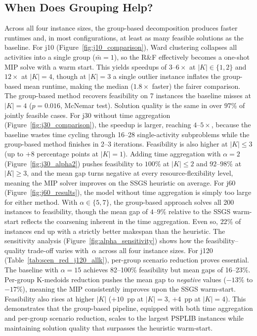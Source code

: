 \subsection{When Does Grouping Help?}
\label{subsec:when_grouping}
Across all four instance sizes, the group-based decomposition
produces faster runtimes and, in most configurations, at least
as many feasible solutions as the baseline.
For j10 (Figure~\ref{fig:j10_comparison}), Ward clustering
collapses all activities into a single group
($\bar{m} = 1$), so the R\&F effectively becomes a
one-shot MIP solve with a warm start. This yields speedups of
$3$--$6\times$ at $|K| \in \{1,2\}$ and $12\times$ at $|K|=4$,
though at $|K|=3$ a single outlier instance inflates the
group-based mean runtime, making the median ($1.8\times$ faster)
the fairer comparison. The group-based method recovers
feasibility on 7 instances the baseline misses at $|K|=4$
($p = 0.016$, McNemar test). Solution quality is the same in
over $97\%$ of jointly feasible cases.
For j30 without time aggregation
(Figure~\ref{fig:j30_comparison}), the speedup is larger,
reaching $4$--$5\times$, because the baseline wastes time cycling
through 16--28 single-activity subproblems while the
group-based method finishes in 2--3 iterations. Feasibility is
also higher at $|K| \leq 3$ (up to $+8$ percentage points at
$|K|=1$). Adding time aggregation with $\alpha = 2$
(Figure~\ref{fig:j30_alpha2}) pushes feasibility to $100\%$ at
$|K| \leq 2$ and $92$--$98\%$ at $|K| \geq 3$, and the mean
gap turns negative at every resource-flexibility level, meaning
the MIP solver improves on the SSGS heuristic on average.
For j60 (Figure~\ref{fig:j60_results}), the model without time
aggregation is simply too large for either method. With
$\alpha \in \{5, 7\}$, the group-based approach solves all 200
instances to feasibility, though the mean gap of $4$--$9\%$
relative to the SSGS warm-start reflects the coarsening inherent
in the time aggregation. Even so, $22\%$ of instances end up
with a strictly better makespan than the heuristic. The
sensitivity analysis (Figure~\ref{fig:alpha_sensitivity}) shows
how the feasibility--quality trade-off varies with~$\alpha$
across all four instance sizes.
For j120 (Table~\ref{tab:scen_red_j120_allk}), per-group
scenario reduction proves essential. The baseline with $\alpha=15$
achieves 82--100\% feasibility but mean gaps of 16--23\%.
Per-group K-medoids reduction pushes the mean gap to
\emph{negative} values ($-13\%$ to $-17\%$), meaning the MIP
consistently improves upon the SSGS warm-start. Feasibility also
rises at higher $|K|$ ($+10$~pp at $|K|=3$, $+4$~pp at $|K|=4$).
This demonstrates that the group-based pipeline, equipped with
both time aggregation and per-group scenario reduction, scales
to the largest PSPLIB instances while maintaining solution quality
that surpasses the heuristic warm-start.
